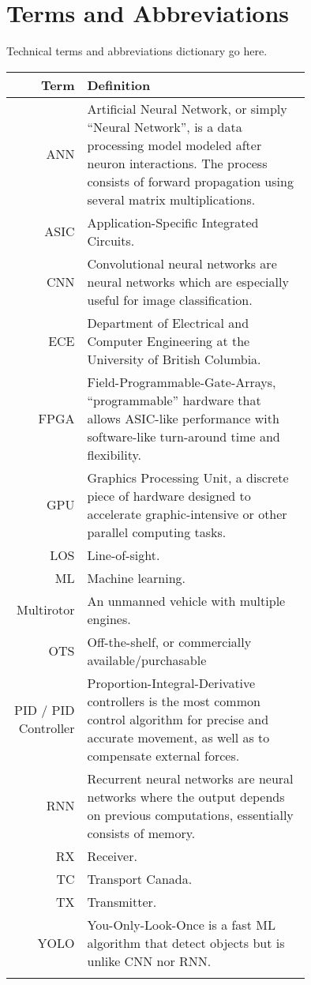 \thispagestyle{empty}

\section*{Terms and Abbreviations}

Technical terms and abbreviations dictionary go here.

\begin{tabular}[h]{rp{0.75\linewidth}}
    \hline
    \textbf{Term} & \textbf{Definition}\\
    \hline

    ANN & Artificial Neural Network, or simply ``Neural Network'', is a data processing model modeled after neuron interactions. The process consists of forward propagation using several matrix multiplications.\cite{ann}\\
    ASIC & Application-Specific Integrated Circuits.\\
    CNN & Convolutional neural networks are neural networks which are especially useful for image classification.\cite{cnn} \\
    ECE & Department of Electrical and Computer Engineering at the University of British Columbia.\\
    FPGA & Field-Programmable-Gate-Arrays, ``programmable'' hardware that allows ASIC-like performance with software-like turn-around time and flexibility.\\
    GPU & Graphics Processing Unit, a discrete piece of hardware designed to accelerate graphic-intensive or other parallel computing tasks.\\
    LOS & Line-of-sight.\\
    ML & Machine learning.\\
    Multirotor & An unmanned vehicle with multiple engines. \\
    OTS & Off-the-shelf, or commercially available/purchasable \\
    PID / PID Controller & Proportion-Integral-Derivative controllers is the most common control algorithm for precise and accurate movement, as well as to compensate external forces.\cite{pid}\\
    RNN & Recurrent neural networks are neural networks where the output depends on previous computations, essentially consists of memory.\cite{rnn}\\
    RX & Receiver.\\
    TC & Transport Canada.\\
    TX & Transmitter.\\
    YOLO & You-Only-Look-Once is a fast ML algorithm that detect objects but is unlike CNN nor RNN.\cite{yolo}\cite{yolo-2}\\
     & \\

    \hline

\end{tabular}
